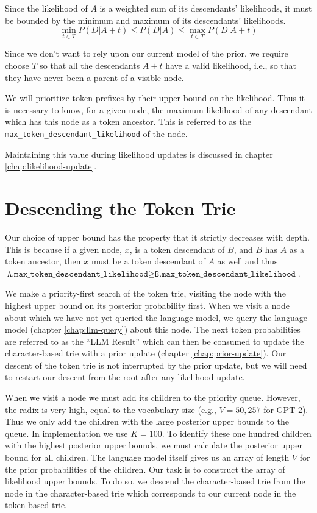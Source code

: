 Since the likelihood of $A$ is a weighted sum of its descendants' likelihoods,
it must be bounded by the minimum and maximum of its descendants' likelihoods.
$$
\min_{t \in T} P(D | A+t) \leq P(D | A) \leq \max_{t \in T} P(D | A+t)
$$

Since we don't want to rely upon our current model of the prior, we require choose $T$ so that all the descendants $A+t$ have
a valid likelihood, i.e., so that they have never been a parent of a visible node.

We will prioritize token prefixes by their upper bound on the likelihood. Thus it is necessary to know, for a given node,
the maximum likelihood of any descendant which has this node as a token ancestor. This is referred to as the \texttt{max\_token\_descendant\_likelihood} of the node.

Maintaining this value during likelihood updates is discussed in chapter \ref{chap:likelihood-update}.

\section{Descending the Token Trie}
Our choice of upper bound has the property that it strictly decreases with depth.
This is because if a given node, $x$, is a token descendant of $B$, and $B$ has $A$ as a token ancestor,
then $x$ must be a token descendant of $A$ as well and thus $\texttt{A.max\_token\_descendant\_likelihood} \geq \texttt{B.max\_token\_descendant\_likelihood}$.

We make a priority-first search of the token trie, visiting the node with the highest upper bound on its posterior probability first.
When we visit a node about which we have not yet queried the language model, we query the language model (chapter \ref{chap:llm-query})
about this node. The next token probabilities are referred to as the ``LLM Result'' which can then be 
consumed to update the character-based trie with a prior update (chapter \ref{chap:prior-update}).
Our descent of the token trie is not interrupted by the prior update,
but we will need to restart our descent from the root after any likelihood update.

When we visit a node we must add its children to the priority queue. However, the radix is very high, equal to the vocabulary size (e.g., $V=50,257$ for GPT-2).
Thus we only add the children with the large posterior upper bounds to the queue. In implementation we use $K=100$.
To identify these one hundred children with the highest posterior upper bounds, we must calculate the posterior upper bound
for all children.
The language model itself gives us an array of length $V$ for the prior probabilities of the children.
Our task is to construct the array of likelihood upper bounds. To do so, we descend the character-based trie
from the node in the character-based trie which corresponds to our current node in the token-based trie.

